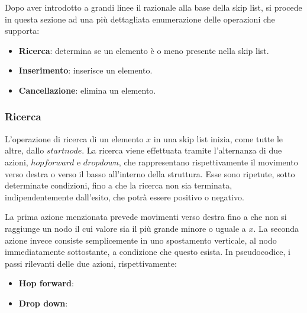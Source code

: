 		Dopo aver introdotto a grandi linee il razionale alla base della skip list, si procede in questa sezione ad una più dettagliata enumerazione delle operazioni che supporta:
		\begin{itemize} 
			\item \textbf{Ricerca}: determina se un elemento è o meno presente nella skip list.
			\item \textbf{Inserimento}: inserisce un elemento.
			\item \textbf{Cancellazione}: elimina un elemento.
		\end{itemize} 
	
		\subsubsection{Ricerca}
			
			L'operazione di ricerca di un elemento $ x $ in una skip list inizia, come tutte le altre, dallo $start node$. La ricerca viene effettuata tramite l'alternanza di due azioni, $ hop forward $ e $ drop down $, che rappresentano rispettivamente il movimento verso destra o verso il basso all'interno della struttura. Esse sono ripetute, sotto determinate condizioni, fino a che la ricerca non sia terminata, indipendentemente dall'esito, che potrà essere positivo o negativo.
			
			La prima azione menzionata prevede movimenti verso destra fino a che non si raggiunge un nodo il cui valore sia il più grande minore o uguale a $ x $. La seconda azione invece consiste semplicemente in uno spostamento verticale, al nodo immediatamente sottostante, a condizione che questo esista.  In pseudocodice, i passi rilevanti delle due azioni, rispettivamente: 
			
			\begin{itemize}
			
			\item \textbf{Hop forward}:
				\begin{algorithm}[H]
				\end{algorithm}
			
			\item \textbf{Drop down}:
				\begin{algorithm}[H]
				\end{algorithm}
			\end{itemize} 
			
